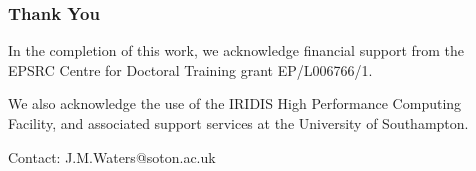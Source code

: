 \documentclass{beamer}
\begin{document}
\begin{frame}
	\frametitle{Thank You}
	In the completion of this work, we acknowledge financial support from the EPSRC Centre for Doctoral Training grant EP/L006766/1. \newline

	We also acknowledge the use of the IRIDIS High Performance Computing Facility, and associated support services at the University of
Southampton. \newline

	Contact: J.M.Waters@soton.ac.uk
\end{frame}
\end{document}
